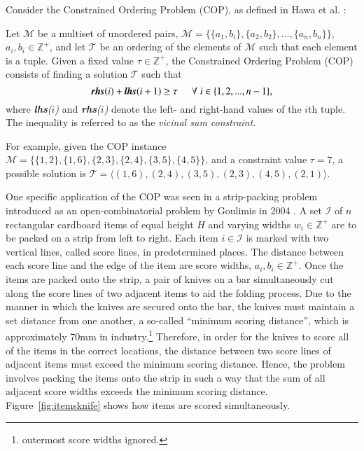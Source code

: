 \documentclass{elsarticle}
\begin{document}
Consider the Constrained Ordering Problem (COP), as defined in Hawa et al. \cite{hawa2018}:
\begin{definition}
	\label{defn:cop}
	Let $\mathcal{M}$ be a multiset of unordered pairs, $\mathcal{M} = \{\{a_1, b_i\}, \{a_2, b_2\},\dotsc,\{a_n, b_n\}\}$, $a_i, b_i \in \mathbb{Z}^+$, and let $\mathcal{T}$ be an ordering of the elements of $\mathcal{M}$ such that each element is a tuple. Given a fixed value $\tau \in \mathbb{Z}^+$, the Constrained Ordering Problem (COP) consists of finding a solution $\mathcal{T}$ such that
	\begin{equation}
	\label{eqn:vsc}
	\emph{\textbf{rhs}}(i) + \emph{\textbf{lhs}}(i+1) \geq \tau \hspace{5mm} \forall \hspace{1mm} i \in \{1,2,..., n-1\},
	\end{equation}
	where \emph{\textbf{lhs}($i$)} and \emph{\textbf{rhs}($i$)} denote the left- and right-hand values of the $i$th tuple. The inequality is referred to as the \emph{vicinal sum constraint}.
\end{definition}

For example, given the COP instance $\mathcal{M} = \{\{1,2\}, \{1,6\}, \{2,3\}, \{2,4\}, \{3,5\}, \{4,5\}\}$, and a constraint value $\tau = 7$, a possible solution is $\mathcal{T} = \langle(1,6), (2,4), (3,5), (2,3), (4,5), (2,1)\rangle$. 

One specific application of the COP was seen in a strip-packing problem introduced as an open-combinatorial problem by Goulimis in 2004 \cite{goulimis2004}. A set $\mathcal{I}$ of $n$ rectangular cardboard items of equal height $H$ and varying widths $w_i \in \mathbb{Z}^+$ are to be packed on a strip from left to right. Each item $i \in \mathcal{I}$ is marked with two vertical lines, called score lines, in predetermined places. The distance between each score line and the edge of the item are score widths, $a_i, b_i \in \mathbb{Z}^+$. Once the items are packed onto the strip, a pair of knives on a bar simultaneously cut along the score lines of two adjacent items to aid the folding process. Due to the manner in which the knives are secured onto the bar, the knives must maintain a set distance from one another, a so-called ``minimum scoring distance'', which is approximately 70mm in industry.\footnote{\alert{outermost score widths ignored.}} Therefore, in order for the knives to score all of the items in the correct locations, the distance between two score lines of adjacent items must exceed the minimum scoring distance. Hence, the problem involves packing the items onto the strip in such a way that the sum of all adjacent score widths exceeds the minimum scoring distance. Figure~\ref{fig:itemsknife} shows how items are scored simultaneously.
\end{document}
